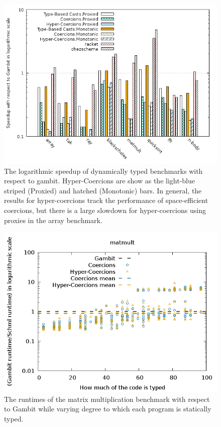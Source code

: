 \documentclass[acmtog, authorversion, acmlarge]{acmart}
\begin{document}
\begin{figure}
  \includegraphics[scale=.47]{dyn.png}
  \caption{
    The logarithmic speedup of dynamically typed benchmarks
    with respect to gambit. Hyper-Coercions are show as the light-blue
    striped (Proxied) and hatched (Monotonic) bars. In general,
    the results for hyper-coercions track the performance of
    space-efficient coercions, but there is a large slowdown for
    hyper-coercions using proxies in the array benchmark.}
  \label{fig:dyn_results}
\end{figure}

\begin{figure}
  \includegraphics[scale=.45]{matmult_Proxied.png}
  \caption{The runtimes of the matrix multiplication benchmark
    with respect to Gambit while varying degree to which each
    program is statically typed.}
  \label{fig:grd_matmult}
\end{figure}
\end{document}
